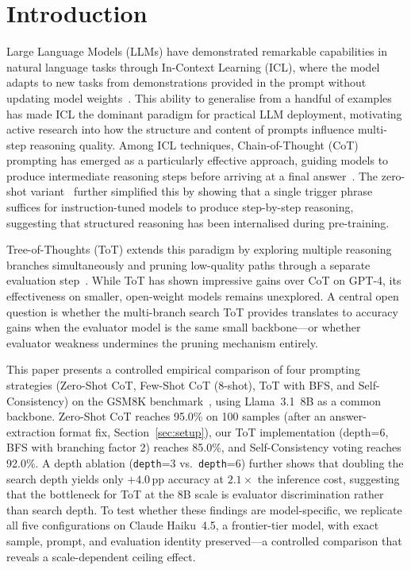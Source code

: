 ﻿\documentclass[runningheads]{llncs}
\begin{document}
\section{Introduction}
\label{sec:intro}

Large Language Models (LLMs) have demonstrated remarkable capabilities
in natural language tasks through In-Context Learning (ICL), where the
model adapts to new tasks from demonstrations provided in the prompt
without updating model weights~\cite{brown2020gpt3}.
This ability to generalise from a handful of examples has made ICL
the dominant paradigm for practical LLM deployment, motivating active
research into how the structure and content of prompts influence
multi-step reasoning quality.
Among ICL techniques, Chain-of-Thought (CoT) prompting has emerged as
a particularly effective approach, guiding models to produce
intermediate reasoning steps before arriving at a final
answer~\cite{wei2022cot}.
The zero-shot variant~\cite{kojima2022zeroshot} further simplified
this by showing that a single trigger phrase suffices for
instruction-tuned models to produce step-by-step reasoning, suggesting
that structured reasoning has been internalised during pre-training.

Tree-of-Thoughts (ToT) extends this paradigm by exploring multiple
reasoning branches simultaneously and pruning low-quality paths through
a separate evaluation step~\cite{yao2023tot}.
While ToT has shown impressive gains over CoT on GPT-4, its
effectiveness on smaller, open-weight models remains unexplored.
A central open question is whether the multi-branch search ToT
provides translates to accuracy gains when the evaluator model is the
same small backbone---or whether evaluator weakness undermines the
pruning mechanism entirely.

This paper presents a controlled empirical comparison of four
prompting strategies (Zero-Shot CoT, Few-Shot CoT (8-shot), ToT
with BFS, and Self-Consistency) on the GSM8K
benchmark~\cite{cobbe2021gsm8k}, using Llama~3.1~8B as a common
backbone.
Zero-Shot CoT reaches 95.0\% on 100 samples (after an
answer-extraction format fix, Section~\ref{sec:setup}), our ToT
implementation (depth=6, BFS with branching factor 2) reaches
85.0\%, and Self-Consistency voting reaches 92.0\%.
A depth ablation (\texttt{depth}=3 vs.\ \texttt{depth}=6) further shows
that doubling the search depth yields only $+4.0$\,pp accuracy at
$2.1\times$ the inference cost, suggesting that the bottleneck for
ToT at the 8B scale is evaluator discrimination rather than search
depth.
To test whether these findings are model-specific, we replicate all
five configurations on Claude Haiku~4.5, a frontier-tier model, with
exact sample, prompt, and evaluation identity preserved---a controlled
comparison that reveals a scale-dependent ceiling effect.
\end{document}
